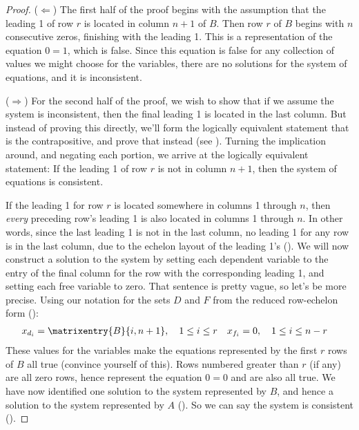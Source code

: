 \begin{proof}
($\Leftarrow$)  The first half of the proof begins with the assumption that the leading 1 of row $r$ is located in column $n+1$ of $B$.  Then row $r$ of $B$ begins with $n$ consecutive zeros, finishing with the leading 1.  This is a representation of the equation $0=1$, which is false.  Since this equation is false for any collection of values we might choose for the variables, there are no solutions for the system of equations, and it is inconsistent.\par
%
($\Rightarrow$)  For the second half of the proof, we wish to show that if we assume the system is inconsistent, then the final leading 1 is located in the last column.  But instead of proving this directly, we'll form the logically equivalent statement that is the contrapositive, and prove that instead (see ).  Turning the implication around, and negating each portion, we arrive at the logically equivalent statement:  If the leading 1 of row $r$ is not in column $n+1$, then the system of equations is consistent.\par
%
If the  leading 1 for row $r$ is located somewhere in columns 1 through $n$, then {\em every} preceding row's leading 1 is also located in columns 1 through $n$.  In other words, since the last leading 1 is not in the last column, no leading 1 for any row is in the last column, due to the echelon layout of the leading 1's ().  We will now construct a solution to the system by setting each dependent variable to the entry of the final column for the row with the corresponding leading 1, and setting each free variable to zero.  That sentence is pretty vague, so let's be more precise.  Using our notation for the sets $D$ and $F$ from the reduced row-echelon form ():
%
\begin{align*}
x_{d_i}&=\matrixentry{B}{i,n+1},\quad 1\leq i\leq r
&
x_{f_i}&=0,\quad 1\leq i\leq n-r
\end{align*}
%
These values for the variables make the equations represented by the first $r$ rows of $B$ all true (convince yourself of this).  Rows numbered greater than $r$ (if any) are all zero rows, hence represent the equation $0=0$ and are also all true.  We have now identified one solution to the system represented by $B$, and hence a solution to the system represented by $A$ ().  So we can say the system is consistent ().
\end{proof}
